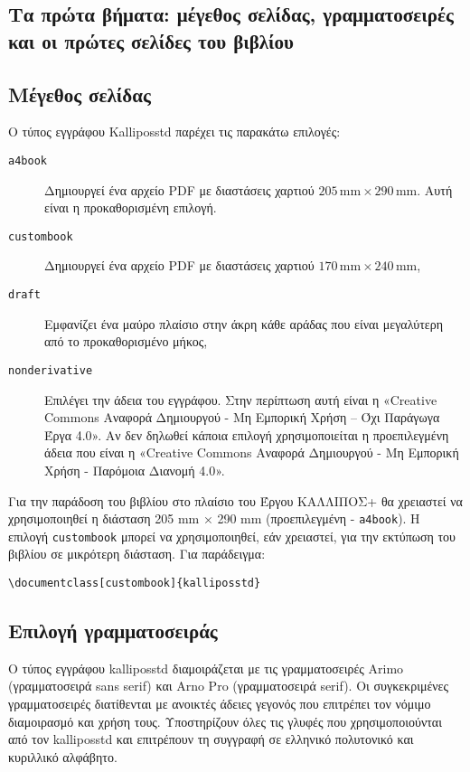 \begin{refsection}
\section{Τα πρώτα βήματα: μέγεθος σελίδας, γραμματοσειρές και οι πρώτες σελίδες του βιβλίου}
\subsection{Μέγεθος σελίδας}
Ο τύπος εγγράφου Kalliposstd παρέχει τις παρακάτω επιλογές:
\begin{description}
\item[\texttt{a4book}] Δημιουργεί ένα αρχείο PDF με διαστάσεις χαρτιού $205\,\text{mm}\times 290\,\text{mm}$.
Αυτή είναι η προκαθορισμένη επιλογή.
%
\item[\texttt{custombook}] Δημιουργεί ένα αρχείο PDF με διαστάσεις χαρτιού $170\,\text{mm}\times 240\,\text{mm}$,
%
\item[\texttt{draft}] Εμφανίζει ένα μαύρο πλαίσιο στην άκρη κάθε αράδας που είναι μεγαλύτερη από το
προκαθορισμένο μήκος,
%
\item[\texttt{nonderivative}] Επιλέγει την άδεια του εγγράφου. Στην περίπτωση αυτή είναι η «Creative Commons Αναφορά Δημιουργού - Μη Εμπορική Χρήση – Όχι Παράγωγα Έργα 4.0». Αν δεν δηλωθεί κάποια επιλογή χρησιμοποιείται η προεπιλεγμένη άδεια που είναι η «Creative Commons Αναφορά Δημιουργού - Μη Εμπορική Χρήση - Παρόμοια Διανομή 4.0».
\end{description}

Για την παράδοση του βιβλίου στο πλαίσιο του Έργου ΚΑΛΛΙΠΟΣ+ θα χρειαστεί να χρησιμοποιηθεί η διάσταση 205 mm × 290 mm (προεπιλεγμένη - \texttt{a4book}). Η επιλογή \texttt{custombook} μπορεί να χρησιμοποιηθεί, εάν χρειαστεί, για την εκτύπωση του βιβλίου σε μικρότερη διάσταση. Για παράδειγμα:
\begin{center}
\verb|\documentclass[custombook]{kalliposstd}|
\end{center}
\subsection{Επιλογή γραμματοσειράς}
Ο τύπος εγγράφου kalliposstd διαμοιράζεται με τις γραμματοσειρές Arimo (γραμματοσειρά sans serif) και Arno Pro (γραμματοσειρά serif). Οι συγκεκριμένες γραμματοσειρές διατίθενται με ανοικτές άδειες γεγονός που επιτρέπει τον νόμιμο διαμοιρασμό και χρήση τους. Υποστηρίζουν όλες τις γλυφές που χρησιμοποιούνται από τον kalliposstd και επιτρέπουν τη συγγραφή σε ελληνικό πολυτονικό και κυριλλικό αλφάβητο.


\end{refsection}
